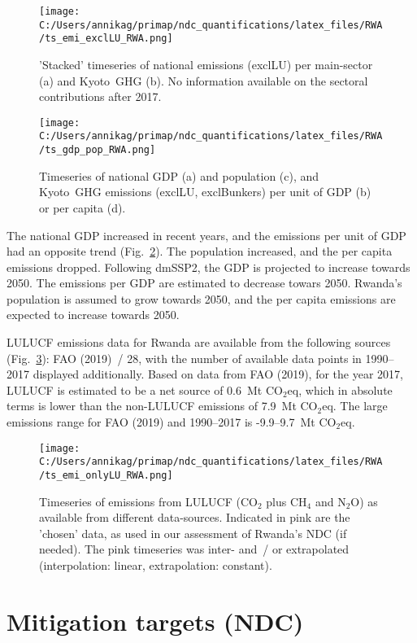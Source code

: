 \documentclass[12pt]{article}
\begin{document}
 \begin{figure}[H]
 \centering
 \texttt{[image: C:/Users/annikag/primap/ndc\_quantifications/latex\_files/RWA/ts\_emi\_exclLU\_RWA.png]}
 \caption{'Stacked' timeseries of national emissions (exclLU) per main-sector (a) and Kyoto~GHG (b). 
 No information available on the sectoral contributions after 2017.}
 \label{fig:tsEmi}
 \end{figure}

 \begin{figure}[H]
 \centering
 \texttt{[image: C:/Users/annikag/primap/ndc\_quantifications/latex\_files/RWA/ts\_gdp\_pop\_RWA.png]}
 \caption{Timeseries of national GDP (a) and population (c), and Kyoto~GHG emissions (exclLU, exclBunkers) per unit of GDP (b) or per capita (d).}
 \label{fig:tsSocioEco}
 \end{figure}

 The national GDP increased in recent years, and the emissions per unit of GDP had an opposite trend (Fig.~\ref{fig:tsSocioEco}).
 The population increased, and the per capita emissions dropped. 
 Following dmSSP2, the GDP is projected to increase towards 2050. 
 The emissions per GDP are estimated to decrease towars 2050. 
 Rwanda's population is assumed to grow towards 2050, and the per capita emissions are expected to increase towards 2050. 

 LULUCF emissions data for Rwanda are available from the following sources (Fig.~\ref{fig:tsLULUCF}): FAO (2019)~/ 28, with the number of available data points in 1990--2017 displayed additionally.
 Based on data from FAO (2019), for the year 2017, LULUCF is estimated to be a net source of 0.6~Mt CO$_2$eq, which in absolute terms is lower than the non-LULUCF emissions of 7.9~Mt CO$_2$eq.
 The large emissions range for FAO (2019) and 1990--2017 is -9.9--9.7~Mt CO$_2$eq.

 \begin{figure}[H]
 \centering
 \texttt{[image: C:/Users/annikag/primap/ndc\_quantifications/latex\_files/RWA/ts\_emi\_onlyLU\_RWA.png]}
 \caption{Timeseries of emissions from LULUCF (CO$_2$ plus CH$_4$ and N$_2$O) as available from different data-sources. 
 Indicated in pink are the 'chosen' data, as used in our assessment of Rwanda's NDC (if needed). 
 The pink timeseries was inter- and~/ or extrapolated (interpolation: linear, extrapolation: constant).}
 \label{fig:tsLULUCF}
 \end{figure}

 \newpage %
 \section{Mitigation targets (NDC)}
 \label{sec:mitiTars}
\end{document}
